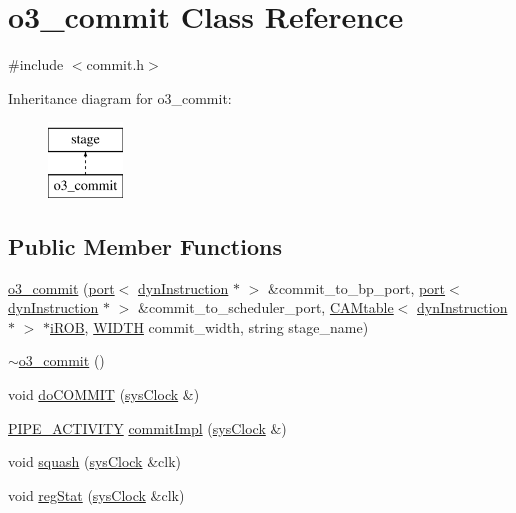 \hypertarget{classo3__commit}{
\section{o3\_\-commit Class Reference}
\label{classo3__commit}
}


{\ttfamily \#include $<$commit.h$>$}

Inheritance diagram for o3\_\-commit:\begin{figure}[H]
\begin{center}
\leavevmode
\includegraphics[height=2.000000cm]{classo3__commit}
\end{center}
\end{figure}
\subsection*{Public Member Functions}
\begin{DoxyCompactItemize}
\item 
\hyperlink{classo3__commit_ad39c647c50b97d4243d30a94a73855c7}{o3\_\-commit} (\hyperlink{classport}{port}$<$ \hyperlink{classdynInstruction}{dynInstruction} $\ast$ $>$ \&commit\_\-to\_\-bp\_\-port, \hyperlink{classport}{port}$<$ \hyperlink{classdynInstruction}{dynInstruction} $\ast$ $>$ \&commit\_\-to\_\-scheduler\_\-port, \hyperlink{classCAMtable}{CAMtable}$<$ \hyperlink{classdynInstruction}{dynInstruction} $\ast$ $>$ $\ast$\hyperlink{backend_2parser_8cpp_ad73ae25f81e6e99482f3fbd5ba9664ce}{iROB}, \hyperlink{global_2global_8h_a6fa2e24b8a418fa215e183264cbea3aa}{WIDTH} commit\_\-width, string stage\_\-name)
\item 
\hyperlink{classo3__commit_a9ececc230499566621371fab58aae228}{$\sim$o3\_\-commit} ()
\item 
void \hyperlink{classo3__commit_a54270cad3a81c7cce6f418517a927b98}{doCOMMIT} (\hyperlink{classsysClock}{sysClock} \&)
\item 
\hyperlink{unit_2stage_8h_ab00e4188e8b8974fecb1dfd12764cbb1}{PIPE\_\-ACTIVITY} \hyperlink{classo3__commit_a87f66e559f7376364630df8b3907e8cd}{commitImpl} (\hyperlink{classsysClock}{sysClock} \&)
\item 
void \hyperlink{classo3__commit_a12cc9b965c48bdf58ede84426c78287b}{squash} (\hyperlink{classsysClock}{sysClock} \&clk)
\item 
void \hyperlink{classo3__commit_a32f24b682cb40b48ac43bcbeb1c8b67d}{regStat} (\hyperlink{classsysClock}{sysClock} \&clk)
\end{DoxyCompactItemize}


